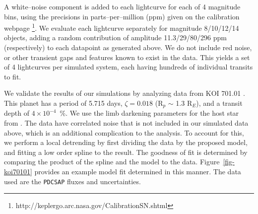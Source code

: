 A white--noise component is added to each lightcurve for each of 4
magnitude bins, using the precisions in parts--per--million (ppm)
given on the \kepler calibration
webpage \footnote{http://keplergo.arc.nasa.gov/CalibrationSN.shtml}.
We evaluate each lightcurve separately for magnitude 8/10/12/14
objects, adding a random contribution of amplitude 11.3/29/80/296 ppm
(respectively) to each datapoint as generated above.  We do not
include red noise, or other transient gaps and features known to exist
in the \kepler data.  This yields a set of 4 lightcurves per simulated
system, each having hundreds of individual transits to fit.

\medskip
{\centerline{}}
\smallskip

We validate the results of our simulations by analyzing \kepler data
from KOI 701.01 \citep[Kepler 62--b;][]{2013arXiv1304.7387B}.  This
planet has a period of 5.715 days, $\zeta = 0.018$ (R$_p$ $\sim$ 1.3
R$_E$), and a transit depth of $4 \times 10^{-4}$~\%.  We use the limb
darkening parameters for the host star from
\cite{2010A&A...510A..21S}.  The \kepler data have correlated noise
that is not included in our simulated data above, which is an
additional complication to the analysis.  To account for this, we
perform a local detrending by first dividing the data by the proposed
model, and fitting a low order spline to the result.  The goodness of
fit is determined by comparing the product of the spline and the model
to the data.  Figure~\ref{fig-koi70101} provides an example model fit
determined in this manner.  The data used are the {\tt PDCSAP} fluxes
and uncertainties.


